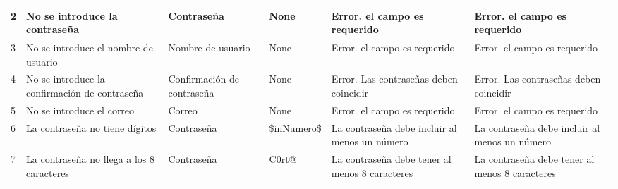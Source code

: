 \begin{longtable}{|p{2cm}|p{2.5cm}|p{2.5cm}|p{2.5cm}|p{2.8cm}|p{2.8cm}|}
    2                                                                  & No se introduce la contraseña                                                                                                                                                      & Contraseña                                & None                        & Error. el campo es requerido                             & Error. el campo es requerido                             \\ \hline
    3                                                                  & No se introduce el nombre de usuario                                                                                                                                               & Nombre de usuario                         & None                        & Error. el campo es requerido                             & Error. el campo es requerido                             \\ \hline
    4                                                                  & No se introduce la confirmación de contraseña                                                                                                                                      & Confirmación de contraseña                & None                        & Error. Las contraseñas deben coincidir                   & Error. Las contraseñas deben coincidir                   \\ \hline
    5                                                                  & No se introduce el correo                                                                                                                                                          & Correo                                    & None                        & Error. el campo es requerido                             & Error. el campo es requerido                             \\ \hline
    6                                                                  & La contraseña no tiene dígitos                                                                                                                                                     & Contraseña                                & \$inNumero\$                & La contraseña debe incluir al menos un número            & La contraseña debe incluir al menos un número            \\ \hline
    7                                                                  & La contraseña no llega a los 8 caracteres                                                                                                                                          & Contraseña                                & C0rt@                       & La contraseña debe tener al menos 8 caracteres           & La contraseña debe tener al menos 8 caracteres           \\ \hline

\end{longtable}
